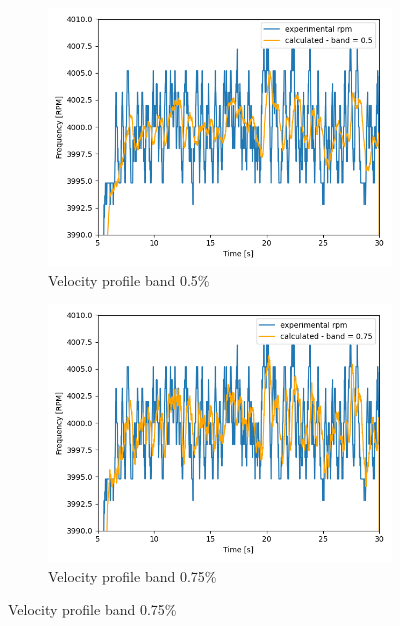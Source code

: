 \documentclass[10pt,fleqn,a4paper,twoside]{article}
\begin{document}
    \newpage
    \begin{figure}[H] 
        
        \centering
        \begin{subfigure}{0.4\textwidth}
            \includegraphics[width=\textwidth]{Figures/rpm_analysis_mic8_band_0.5.png}
            \caption{Velocity profile band 0.5\%}
            \label{fig:second}
        \end{subfigure}
        \hfill
        \centering
        \begin{subfigure}{0.4\textwidth}
            \includegraphics[width=\textwidth]{Figures/rpm_analysis_mic8_band_0.75.png}
            \caption{Velocity profile band 0.75\%}
            \label{fig:third}

\end{subfigure}
\end{figure}
\end{document}
